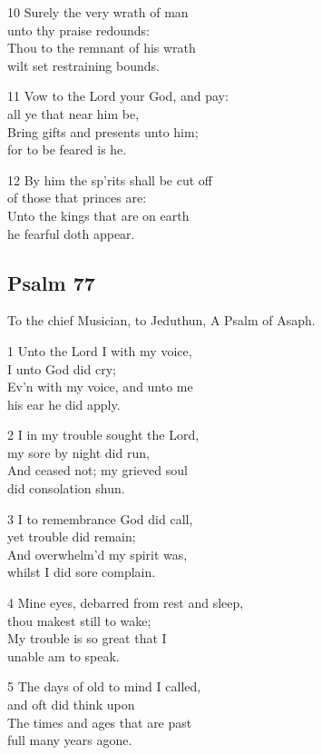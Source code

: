 10 Surely the very wrath of man\\
unto thy praise redounds:\\
Thou to the remnant of his wrath\\
wilt set restraining bounds.

11 Vow to the Lord your God, and pay:\\
all ye that near him be,\\
Bring gifts and presents unto him;\\
for to be feared is he.

12 By him the sp’rits shall be cut off\\
of those that princes are:\\
Unto the kings that are on earth\\
he fearful doth appear.

\begin{center}
\quad{}\quad{}
\end{center}


\subsection*{Psalm 77}

To the chief Musician, to Jeduthun,
A Psalm of Asaph.

1 Unto the Lord I with my voice,\\
I unto God did cry;\\
Ev’n with my voice, and unto me\\
his ear he did apply.

2 I in my trouble sought the Lord,\\
my sore by night did run,\\
And ceased not; my grieved soul\\
did consolation shun.

3 I to remembrance God did call,\\
yet trouble did remain;\\
And overwhelm’d my spirit was,\\
whilst I did sore complain.

4 Mine eyes, debarred from rest and sleep,\\
thou makest still to wake;\\
My trouble is so great that I\\
unable am to speak.

5 The days of old to mind I called,\\
and oft did think upon\\
The times and ages that are past\\
full many years agone.

